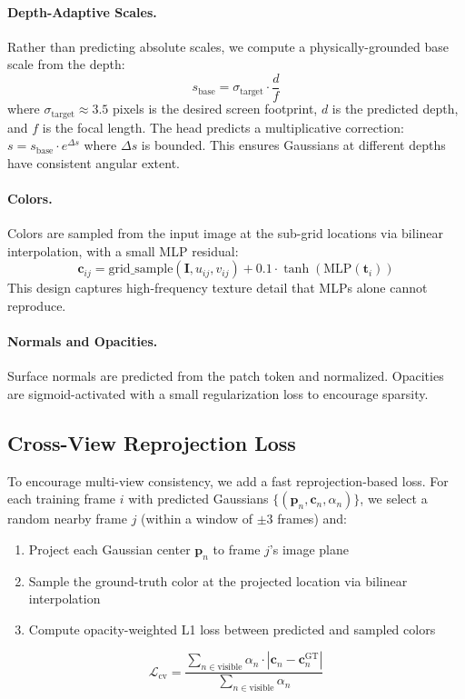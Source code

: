 \documentclass[10pt,twocolumn]{article}
\begin{document}
\paragraph{Depth-Adaptive Scales.}
Rather than predicting absolute scales, we compute a physically-grounded base scale from the depth:
\begin{equation}
    s_{\text{base}} = \sigma_{\text{target}} \cdot \frac{d}{f}
\end{equation}
where $\sigma_{\text{target}} \approx 3.5$ pixels is the desired screen footprint, $d$ is the predicted depth, and $f$ is the focal length.
The head predicts a multiplicative correction: $s = s_{\text{base}} \cdot e^{\Delta s}$ where $\Delta s$ is bounded.
This ensures Gaussians at different depths have consistent angular extent.

\paragraph{Colors.}
Colors are sampled from the input image at the sub-grid locations via bilinear interpolation, with a small MLP residual:
\begin{equation}
    \mathbf{c}_{ij} = \text{grid\_sample}(\mathbf{I}, u_{ij}, v_{ij}) + 0.1 \cdot \tanh(\text{MLP}(\mathbf{t}_i))
\end{equation}
This design captures high-frequency texture detail that MLPs alone cannot reproduce.

\paragraph{Normals and Opacities.}
Surface normals are predicted from the patch token and normalized.
Opacities are sigmoid-activated with a small regularization loss to encourage sparsity.

\subsection{Cross-View Reprojection Loss}

To encourage multi-view consistency, we add a fast reprojection-based loss.
For each training frame $i$ with predicted Gaussians $\{(\mathbf{p}_n, \mathbf{c}_n, \alpha_n)\}$, we select a random nearby frame $j$ (within a window of $\pm 3$ frames) and:
\begin{enumerate}
    \item Project each Gaussian center $\mathbf{p}_n$ to frame $j$'s image plane
    \item Sample the ground-truth color at the projected location via bilinear interpolation
    \item Compute opacity-weighted L1 loss between predicted and sampled colors
\end{enumerate}
\begin{equation}
    \mathcal{L}_{\text{cv}} = \frac{\sum_{n \in \text{visible}} \alpha_n \cdot |\mathbf{c}_n - \mathbf{c}^{\text{GT}}_n|}{\sum_{n \in \text{visible}} \alpha_n}
\end{equation}
\end{document}

